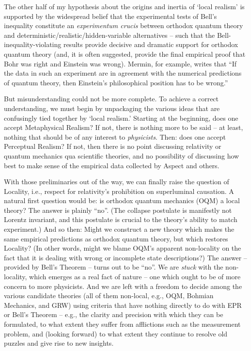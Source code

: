 \documentclass[12pt]{article}
\begin{document}
The other half of my hypothesis about the origins and inertia of
`local realism' is supported by the widespread belief
that the experimental tests of Bell's
inequality constitute an \emph{experimentum crucis} between orthodox
quantum theory and deterministic/realistic/hidden-variable
alternatives -- such that the Bell-inequality-violating results
provide decisive and dramatic support for orthodox quantum theory
(and, it is often suggested, provide the final empirical proof that
Bohr was right and Einstein was wrong).  Mermin, for example, writes
that ``If the
data in such an experiment are in agreement with the numerical
predictions of quantum theory, then Einstein's philosophical position
has to be wrong.'' \cite{moon}

But misunderstanding could not be more complete.  To achieve a correct
understanding, we must begin by
unpackaging the various ideas that are confusingly tied
together by `local realism.'  Starting at the beginning, does one
accept Metaphysical Realism?  If not, there is nothing more to be said
-- at least, nothing that should be of any interest to
\emph{physicists}.  Then:  does one accept Perceptual Realism?  If
not, then there is no point discussing relativity or quantum mechanics
qua scientific theories, and no possibility of discussing how best to
make sense of the empirical data collected by Aspect and others.  

With
those preliminaries out of the way, we can finally raise the question
of Locality, i.e., respect for relativity's prohibition on
superluminal causation.  A natural first question would be:  is
orthodox quantum mechanics (OQM) a local theory?  The answer is plainly
``no''.  (The collapse postulate is manifestly not Lorentz invariant,
and this postulate is crucial to the theory's ability to match
experiment.)  And so then:  Might we
construct a new theory which makes the same empirical
predictions as orthodox quantum theory, but which restores Locality?
(In other words, might we blame OQM's apparent non-locality on the
fact that it is dealing with wrong or incomplete state descriptions?)
The answer -- provided by Bell's Theorem -- turns out to be ``no''.
We are \emph{stuck} with the non-locality, which emerges as a real
fact of nature -- one which ought to be of more concern to more
physicists. 
And we are left with a freedom to decide among the various candidate
theories (all of them non-local, e.g., OQM, Bohmian Mechanics, and
GRW) using criteria that have nothing directly to do with EPR or
Bell's Theorem -- e.g., the clarity and precision with which they can be
formulated, to what extent they suffer from afflictions such as the
measurement problem, and (looking forward) to what extent they 
continue to resolve old puzzles and give rise to new insights.  
\end{document}
